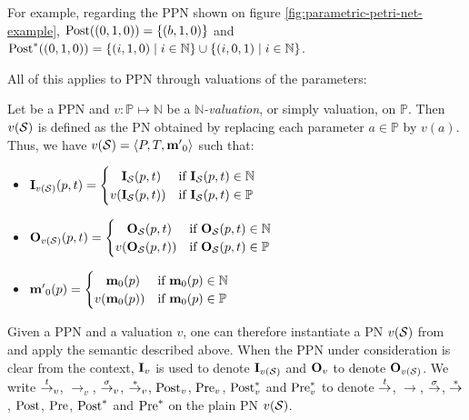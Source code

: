 For example, regarding the \ac{PPN} shown on figure \ref{fig:parametric-petri-net-example},
$\operatorname{Post}((0,1,0)) = \{(b, 1, 0)\}$
and
$\operatorname{Post}^*((0,1,0)) = \{(i, 1, 0) \mid i \in \mathbb{N}\} \cup \{(i, 0, 1) \mid i \in \mathbb{N}\}$.

All of this applies to \ac{PPN} through valuations of the parameters:
\begin{defi}
  Let \SPTPm be a \ac{PPN} and $v : \mathbb{P} \mapsto \mathbb{N}$ be a \emph{$\mathbb{N}$-valuation}, or simply valuation, on $\mathbb{P}$.
  Then $v(\mathcal{S})$ is defined as the \ac{PN} obtained by replacing each parameter $a \in \mathbb{P}$ by $v(a)$.
  Thus, we have $v(\mathcal{S}) = \langle P, T, \mathbf{m'}_0\rangle$ such that:
  \begin{itemize}
    \item $\mathbf{I}_{v(\mathcal{S})}(p, t) =
      \begin{cases}
        \phantom{v(}\mathbf{I}_\mathcal{S}(p, t) & \text{if } \mathbf{I}_\mathcal{S}(p, t) \in \mathbb{N} \\
                 v(\mathbf{I}_\mathcal{S}(p, t)) & \text{if } \mathbf{I}_\mathcal{S}(p, t) \in \mathbb{P}
      \end{cases}$
    \item $\mathbf{O}_{v(\mathcal{S})}(p, t) =
      \begin{cases}
        \phantom{v(}\mathbf{O}_\mathcal{S}(p, t) & \text{if } \mathbf{O}_\mathcal{S}(p, t) \in \mathbb{N} \\
                 v(\mathbf{O}_\mathcal{S}(p, t)) & \text{if } \mathbf{O}_\mathcal{S}(p, t) \in \mathbb{P}
      \end{cases}$
    \item $\mathbf{m'}_0(p) =
      \begin{cases}
        \phantom{v(}\mathbf{m}_0(p) & \text{if } \mathbf{m}_0(p) \in \mathbb{N} \\
                 v(\mathbf{m}_0(p)) & \text{if } \mathbf{m}_0(p) \in \mathbb{P}
      \end{cases}$
  \end{itemize}
\end{defi}

Given \PPN a \ac{PPN} and a valuation $v$, one can therefore instantiate a \ac{PN} $v(\mathcal{S})$ from \PPN and apply the semantic described above.  When the \ac{PPN} under consideration is clear from the context, $\mathbf{I}_v$ is used to denote $\mathbf{I}_{v(\mathcal{S})}$ and $\mathbf{O}_v$ to denote $\mathbf{O}_{v(\mathcal{S})}$. We write $\stackrel{t}{\to}_v$, $\rightarrow_v$, $\stackrel{\sigma}{\to}_v$, $\stackrel{*}{\to}_v$, $\operatorname{Post}_v$, $\operatorname{Pre}_v$, $\operatorname{Post}^*_v$ and $\operatorname{Pre}^*_v$ to denote $\stackrel{t}{\to}$, $\rightarrow$, $\stackrel{\sigma}{\to}$, $\stackrel{*}{\to}$, $\operatorname{Post}$, $\operatorname{Pre}$, $\operatorname{Post}^*$ and $\operatorname{Pre}^*$ on the plain \ac{PN} $v(\mathcal{S})$.

